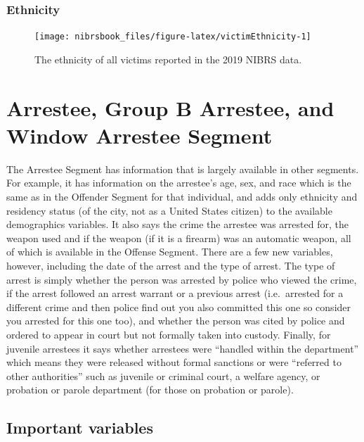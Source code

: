 \documentclass[
  12pt,
  openany]{book}
\begin{document}
\hypertarget{ethnicity}{%
\subsection{Ethnicity}\label{ethnicity}}

\begin{figure}

{\centering \texttt{[image: nibrsbook\_files/figure-latex/victimEthnicity-1]} 

}

\caption{The ethnicity of all victims reported in the 2019 NIBRS data.}\label{fig:victimEthnicity}
\end{figure}

\hypertarget{arrestee}{%
\chapter{Arrestee, Group B Arrestee, and Window Arrestee Segment}\label{arrestee}}

The Arrestee Segment has information that is largely available in other segments. For example, it has information on the arrestee's age, sex, and race which is the same as in the Offender Segment for that individual, and adds only ethnicity and residency status (of the city, not as a United States citizen) to the available demographics variables. It also says the crime the arrestee was arrested for, the weapon used and if the weapon (if it is a firearm) was an automatic weapon, all of which is available in the Offense Segment. There are a few new variables, however, including the date of the arrest and the type of arrest. The type of arrest is simply whether the person was arrested by police who viewed the crime, if the arrest followed an arrest warrant or a previous arrest (i.e.~arrested for a different crime and then police find out you also committed this one so consider you arrested for this one too), and whether the person was cited by police and ordered to appear in court but not formally taken into custody. Finally, for juvenile arrestees it says whether arrestees were ``handled within the department'' which means they were released without formal sanctions or were ``referred to other authorities'' such as juvenile or criminal court, a welfare agency, or probation or parole department (for those on probation or parole).

\hypertarget{important-variables-4}{%
\section{Important variables}\label{important-variables-4}}
\end{document}

